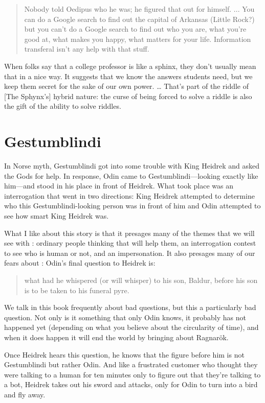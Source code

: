 \begin{quote}
Nobody told Oedipus who he was; he figured that out for himself.  ... You can do a Google search to find out the capital of Arkansas (Little Rock?) but you can’t do a Google search to find out who you are, what you’re good at, what makes you happy, what matters for your life.  Information transferal isn’t any help with that stuff.
\end{quote}

When folks say that a college professor is like a sphinx, they don’t usually mean that in a nice way.  It suggests that we know the answers students need, but we keep them secret for the sake of our own power.  … That’s part of the riddle of [The Sphynx’s] hybrid nature: the curse of being forced to solve a riddle is also the gift of the ability to solve riddles. 

\section{Gestumblindi}

In Norse myth, Gestumblindi got into some trouble with King Heidrek and asked the Gods for help.
%
In response, Odin came to Gestumblindi---looking exactly like him---and stood in his place in front of Heidrek.
%
What took place was an interrogation that went in two directions: King Heidrek attempted to determine who this Gestumblindi-looking person was in front of him and Odin attempted to see how smart King Heidrek was.

What I like about this story is that it presages many of the themes that we will see with : ordinary people thinking that  will help them, an interrogation contest to see who is human or not, and an impersonation.
%
It also presages many of our fears about : Odin's final question to Heidrek is:
\begin{quote}
what had he whispered (or will whisper) to his son, Baldur, before his son is to
be taken to his funeral pyre.
\end{quote}
We talk in this book frequently about bad questions, but this a particularly bad question.  Not only is it something that only Odin knows, it probably has not happened yet (depending on what you believe about the circularity of time), and when it does happen it will end the world by bringing about Ragnar\"ok.  


Once Heidrek hears this question, he knows that the figure before him is not Gestumblindi but rather Odin.
%
And like a frustrated customer who thought they were talking to a human for ten minutes only to figure out that they're talking to a bot, Heidrek takes out his sword and attacks, only for Odin to turn into a bird and fly away.

